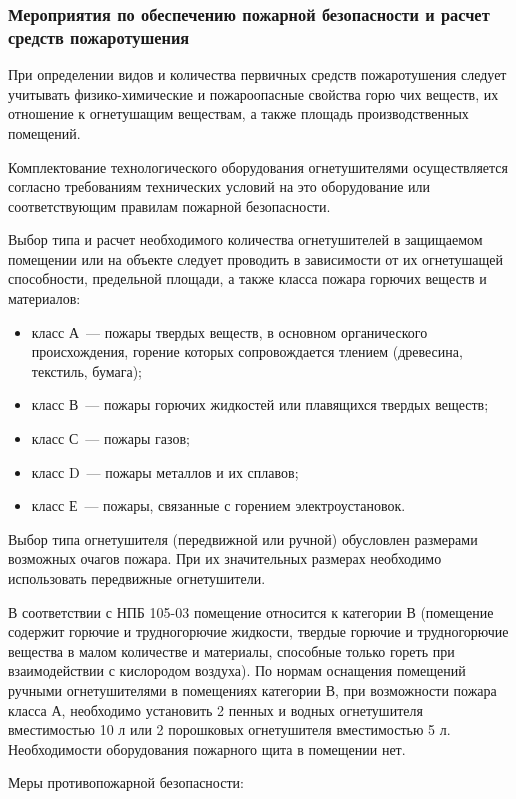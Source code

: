 \subsubsection{Мероприятия по обеспечению пожарной безопасности и расчет средств пожаротушения}

При определении видов и количества первичных средств пожаротушения следует учитывать физико-химические и пожароопасные свойства горю чих веществ, их отношение к огнетушащим веществам, а также площадь производственных помещений.

Комплектование технологического оборудования огнетушителями осуществляется согласно требованиям технических условий на это оборудование или соответствующим правилам пожарной безопасности.

Выбор типа и расчет необходимого количества огнетушителей в защищаемом помещении или на объекте следует проводить в зависимости от их огнетушащей способности, предельной площади, а также класса пожара горючих веществ и материалов:
\begin{itemize}
  \item класс А~--- пожары твердых веществ, в основном органического происхождения, горение которых сопровождается тлением (древесина, текстиль, бумага);
  \item класс В~--- пожары горючих жидкостей или плавящихся твердых веществ;
  \item класс С~--- пожары газов;
  \item класс D~--- пожары металлов и их сплавов;
  \item класс Е~--- пожары, связанные с горением электроустановок.
\end{itemize}

Выбор типа огнетушителя (передвижной или ручной) обусловлен размерами возможных очагов пожара.
При их значительных размерах необходимо использовать передвижные огнетушители.

В соответствии с НПБ 105-03 помещение относится к категории В (помещение содержит горючие и трудногорючие жидкости, твердые горючие и трудногорючие вещества в малом количестве и материалы, способные только гореть при взаимодействии с кислородом воздуха).
По нормам оснащения помещений ручными огнетушителями в помещениях категории В, при возможности пожара класса А, необходимо установить 2 пенных и водных огнетушителя вместимостью 10 л или 2 порошковых огнетушителя вместимостью 5 л.
Необходимости оборудования пожарного щита в помещении нет.

Меры противопожарной безопасности:

